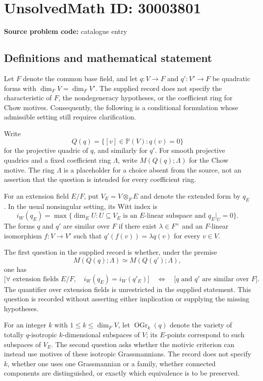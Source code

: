 \documentclass[11pt]{article}
\begin{document}
\section*{UnsolvedMath ID: 30003801}
\textbf{Source problem code:} catalogue entry
\subsection{Definitions and mathematical statement}
Let \(F\) denote the common base field, and let \(q:V\to F\) and \(q':V'\to F\) be quadratic forms with \(\dim_F V=\dim_F V'\). The supplied record does not specify the characteristic of \(F\), the nondegeneracy hypotheses, or the coefficient ring for Chow motives. Consequently, the following is a conditional formulation whose admissible setting still requires clarification.

Write
\[
Q(q)=\{[v]\in\mathbb P(V):q(v)=0\}
\]
for the projective quadric of \(q\), and similarly for \(q'\). For smooth projective quadrics and a fixed coefficient ring \(\Lambda\), write \(M(Q(q);\Lambda)\) for the Chow motive. The ring \(\Lambda\) is a placeholder for a choice absent from the source, not an assertion that the question is intended for every coefficient ring.

For an extension field \(E/F\), put \(V_E=V\otimes_F E\) and denote the extended form by \(q_E\). In the usual nonsingular setting, its Witt index is
\[
i_W(q_E)=\max\{\dim_E U:U\subseteq V_E\text{ is an }E\text{-linear subspace and }q_E|_U=0\}.
\]
The forms \(q\) and \(q'\) are similar over \(F\) if there exist \(\lambda\in F^\times\) and an \(F\)-linear isomorphism \(f:V\to V'\) such that \(q'(f(v))=\lambda q(v)\) for every \(v\in V\).

The first question in the supplied record is whether, under the premise
\[
M(Q(q);\Lambda)\simeq M(Q(q');\Lambda),
\]
one has
\[
\bigl[\forall\text{ extension fields }E/F,\quad i_W(q_E)=i_W(q'_E)\bigr]
\quad\Longleftrightarrow\quad
\bigl[q\text{ and }q'\text{ are similar over }F\bigr].
\]
The quantifier over extension fields is unrestricted in the supplied statement. This question is recorded without asserting either implication or supplying the missing hypotheses.

For an integer \(k\) with \(1\leq k\leq\dim_F V\), let \(\operatorname{OGr}_k(q)\) denote the variety of totally \(q\)-isotropic \(k\)-dimensional subspaces of \(V\); its \(E\)-points correspond to such subspaces of \(V_E\). The second question asks whether the motivic criterion can instead use motives of these isotropic Grassmannians. The record does not specify \(k\), whether one uses one Grassmannian or a family, whether connected components are distinguished, or exactly which equivalence is to be preserved.
\end{document}
